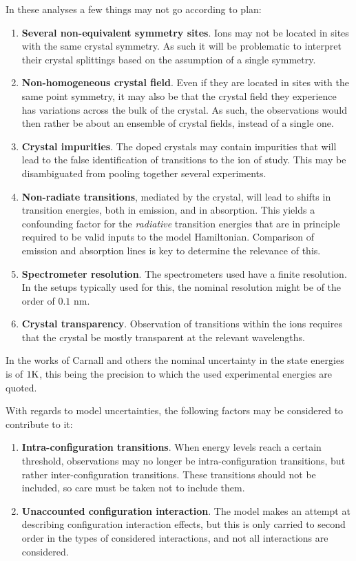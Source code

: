 \documentclass{article}
\begin{document}
In these analyses a few things may not go according to plan:

\begin{enumerate}
\item \textbf{Several non-equivalent symmetry sites}. Ions may not be located in sites with the same crystal symmetry. As such it will be problematic to interpret their crystal splittings based on the assumption of a single symmetry.
\item \textbf{Non-homogeneous crystal field}. Even if they are located in sites with the same point symmetry, it may also be that the crystal field they experience has variations across the bulk of the crystal. As such, the observations would then rather be about an ensemble of crystal fields, instead of a single one.
\item \textbf{Crystal impurities}. The doped crystals may contain impurities that will lead to the false identification of transitions to the ion of study. This may be disambiguated from pooling together several experiments.
\item \textbf{Non-radiate transitions}, mediated by the crystal, will lead to shifts in transition energies, both in emission, and in absorption. This yields a confounding factor for the \textit{radiative} transition energies that are in principle required to be valid inputs to the model Hamiltonian. Comparison of emission and absorption lines is key to determine the relevance of this.
\item \textbf{Spectrometer resolution}. The spectrometers used have a finite resolution. In the setups typically used for this, the nominal resolution might be of the order of $0.1\text{ nm}$.
\item \textbf{Crystal transparency}. Observation of transitions within the ions requires that the crystal be mostly transparent at the relevant wavelengths.
\end{enumerate}

In the works of Carnall and others the nominal uncertainty in the state energies is of $1 \text{K}$, this being the precision to which the used experimental energies are quoted.

With regards to model uncertainties, the following factors may be considered to contribute to it: 
\begin{enumerate}
\item \textbf{Intra-configuration transitions}. When energy levels reach a certain threshold, observations may no longer be intra-configuration transitions, but rather inter-configuration transitions. These transitions should not be included, so care must be taken not to include them.
\item \textbf{Unaccounted configuration interaction}. The model makes an attempt at describing configuration interaction effects, but this is only carried to second order in the types of considered interactions, and not all interactions are considered.
\end{enumerate}
\end{document}
